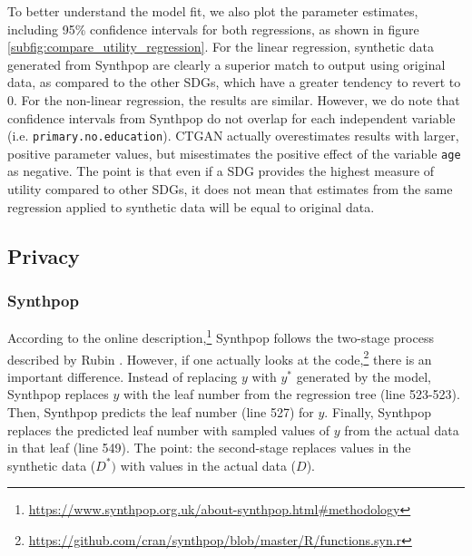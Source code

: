 \documentclass[runningheads]{llncs}
\begin{document}
To better understand the model fit, we also plot the parameter estimates, including 95\% confidence intervals for both regressions, as shown in figure \ref{subfig:compare_utility_regression}.  For the linear regression, synthetic data generated from Synthpop are clearly a superior match to output using original data, as compared to the other SDGs, which have a greater tendency to revert to 0.  For the non-linear regression, the results are similar.  However, we do note that confidence intervals from Synthpop do not overlap for each independent variable (i.e. \texttt{primary.no.education}).  CTGAN actually overestimates results with larger, positive parameter values, but misestimates the positive effect of the variable \texttt{age} as negative.  The point is that even if a SDG provides the highest measure of utility compared to other SDGs, it does not mean that estimates from the same regression applied to synthetic data will be equal to original data.

\subsection{Privacy}

\subsubsection{Synthpop} 

According to the online description,\footnote{\url{https://www.synthpop.org.uk/about-synthpop.html\#methodology}} Synthpop follows the two-stage process described by Rubin \citep{rubin1993statistical}.  However, if one actually looks at the code,\footnote{\url{https://github.com/cran/synthpop/blob/master/R/functions.syn.r}} there is an important difference.  Instead of replacing $y$ with $y^*$ generated by the model, Synthpop replaces $y$ with the leaf number from the regression tree (line 523-523).  Then, Synthpop predicts the leaf number (line 527) for $y$.  Finally, Synthpop replaces the predicted leaf number with sampled values of $y$ from the actual data in that leaf (line 549).  The point: the second-stage replaces values in the synthetic data ($D^*)$ with values in the actual data ($D$).  
\end{document}
